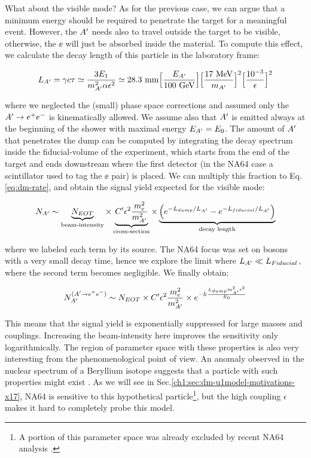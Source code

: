 What about the visible mode? As for the previous case, we can argue that a minimum energy should be required to penetrate the target for a meaningful event. However, the $A'$ needs also to travel outside the target to be visible, otherwise, the $\ee$ will just be absorbed inside the material. To compute this effect, we calculate the decay length of this particle in the laboratory frame:

\begin{eqnarray}
  L_{A'} = \gamma c \tau \simeq \frac{3E_1}{m^2_{A'}\alpha \epsilon^2} \simeq 28.3 ~{\rm mm}  \Bigl[\frac{E_{A'}}{100~ {\rm GeV}}\Bigr] 
  \Bigl[\frac{17~ {\rm MeV}}{m_{A'}}\Bigr]^2 \Bigl[\frac{10^{-3}}{\epsilon}\Bigr]^2
  \label{eq:dm-decay-length}
\end{eqnarray}

where we neglected the (small) phase space corrections and assumed only the $A' \to e^+e^-$ is kinematically allowed. We assume also that $A'$ is emitted always at the beginning of the shower with maximal energy $E_{A'} = E_0$. The amount of $A'$ that penetrates the dump can be computed by integrating the decay spectrum inside the fiducial-volume of the experiment, which starts from the end of the target and ends downstream where the first detector (in the NA64 case a scintillator used to tag the $\ee$ pair) is placed. We can multiply this fraction to Eq.\ref{eq:dm-rate}, and obtain the signal yield expected for the visible mode:

\begin{equation}
  \label{eq:dm-rate-vis}
    N_{A'} \sim \underbrace{N_{EOT}}_{\textrm{beam-intensity}} \times \underbrace{C' \epsilon^2 \frac{m_e^2}{m^2_{A'}}}_{\textrm{cross-section}} \times \underbrace{\left(e^{- L_{dump}/L_{A'}} - e^{-L_{fiducial}/L_{A'}}\right)}_{\textrm{decay length}}
  \end{equation}

  where we labeled each term by its source. The NA64 focus was set on bosons with a very small decay time, hence we explore the limit where $L_{A'} \ll L_{Fiducial}$, where the second term becomes negligible. We finally obtain:

  \begin{equation}
    \label{eq:dm-rate-vis-limit}
    N_{A'}^{(A' \to e^+e^-)} \sim N_{EOT} \times C' \epsilon^2 \frac{m_e^2}{m^2_{A'}} \times e^{-k\frac{L_{dump} m^2_{A'}\epsilon^2}{E_0}}
  \end{equation}

  This means that the signal yield is exponentially suppressed for large masses and couplings. Increasing the beam-intensity here improves the sensitivity only logarithmically. The region of parameter space with these properties is also very interesting from the phenomenological point of view. An anomaly observed in the nuclear spectrum of a Beryllium isotope suggests that a particle with such properties might exist \cite{Krasznahorkay:2015iga}. As we will see in Sec.\ref{ch1:sec:dm-u1model-motivations-x17}, NA64 is sensitive to this hypothetical particle\footnote{A portion of this parameter space was already excluded by recent NA64 analysis \cite{Banerjee:2019hmi,Banerjee:2018vgk}.}, but the high coupling $\epsilon$ makes it hard to completely probe this model.

